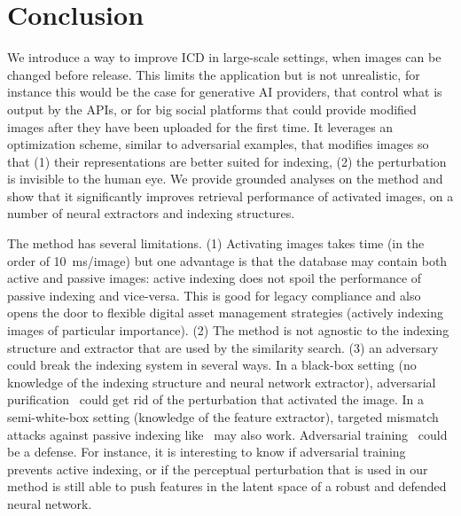 

\section{Conclusion}

We introduce a way to improve ICD in large-scale settings, when images can be changed before release.
This limits the application but is not unrealistic, for instance this would be the case for generative AI providers, that control what is output by the APIs, or for big social platforms that could provide modified images after they have been uploaded for the first time.
It leverages an optimization scheme, similar to adversarial examples, that modifies images so that (1) their representations are better suited for indexing, (2) the perturbation is invisible to the human eye.
We provide grounded analyses on the method and show that it significantly improves retrieval performance of activated images, on a number of neural extractors and indexing structures.

The method has several limitations. 
(1) Activating images takes time (in the order of 10~ms/image) but one advantage is that the database may contain both active and passive images: active indexing does not spoil the performance of passive indexing and vice-versa. This is good for legacy compliance and also opens the door to flexible digital asset management strategies (actively indexing images of particular importance).
(2) The method is not agnostic to the indexing structure and extractor that are used by the similarity search.
(3) an adversary could break the indexing system in several ways.
In a black-box setting (no knowledge of the indexing structure and neural network extractor), adversarial purification~\citep{shi2021online} could get rid of the perturbation that activated the image.
In a semi-white-box setting (knowledge of the feature extractor), targeted mismatch attacks against passive indexing like~\citep{tolias2019targeted} may also work. 
Adversarial training~\citep{madry2017towards} could be a defense.
For instance, it is interesting to know if adversarial training prevents active indexing, or if the perceptual perturbation that is used in our method is still able to push features in the latent space of a robust and defended neural network. 



